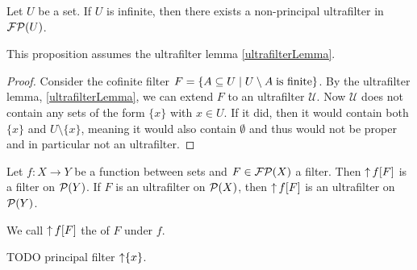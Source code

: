 \begin{proposition}
Let $U$ be a set. If $U$ is infinite, then there exists a non-principal ultrafilter in $\operatorname{\mathcal{FP}}(U)$.
\end{proposition}
This proposition assumes the ultrafilter lemma \ref{ultrafilterLemma}.
\begin{proof}
Consider the cofinite filter $F = \left\{ A\subseteq U \;\middle|\; U\setminus A\;\text{is finite} \right\}$. By the ultrafilter lemma, \ref{ultrafilterLemma}, we can extend $F$ to an ultrafilter $\mathcal{U}$. Now $\mathcal{U}$ does not contain any sets of the form $\{x\}$ with $x\in U$. If it did, then it would contain both $\{x\}$ and $U\setminus\{x\}$, meaning it would also contain $\emptyset$ and thus would not be proper and in particular not an ultrafilter.
\end{proof}

\begin{proposition}
Let $f:X\to Y$ be a function between sets and $F\in \operatorname{\mathcal{FP}}(X)$ a filter. Then $\operatorname{\uparrow} f[F]$ is a filter on $\operatorname{\mathcal{P}}(Y)$. If $F$ is an ultrafilter on $\operatorname{\mathcal{P}}(X)$, then $\operatorname{\uparrow} f[F]$ is an ultrafilter on $\operatorname{\mathcal{P}}(Y)$.
\end{proposition}
We call $\operatorname{\uparrow} f[F]$ the  of $F$ under $f$.

\begin{definition}
TODO principal filter $\operatorname{\uparrow}\{x\}$.
\end{definition}


